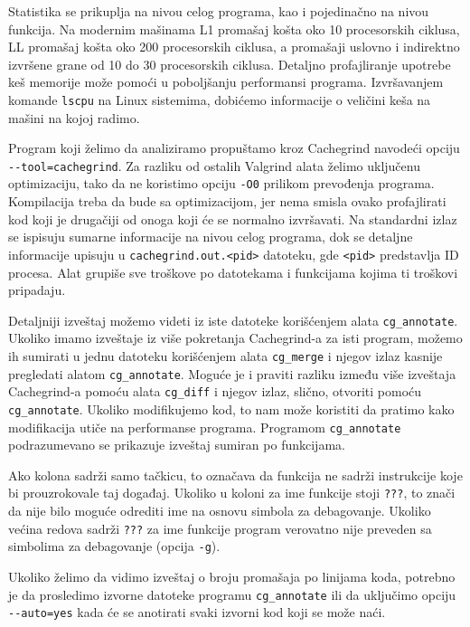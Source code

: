 Statistika se prikuplja na nivou celog programa, kao i pojedinačno na nivou funkcija. Na modernim mašinama L1 promašaj košta oko 10 procesorskih ciklusa, LL promašaj košta oko 200 procesorskih ciklusa, a promašaji uslovno i indirektno izvršene grane od 10 do 30 procesorskih ciklusa. Detaljno profajliranje upotrebe keš memorije može pomoći u poboljšanju performansi programa. Izvršavanjem komande \texttt{lscpu} na Linux sistemima, dobićemo informacije o veličini keša na mašini na kojoj radimo.

Program koji želimo da analiziramo propuštamo kroz Cachegrind navodeći opciju \texttt{-\/-tool=cachegrind}. Za razliku od ostalih Valgrind alata želimo uključenu optimizaciju, tako da ne koristimo opciju \texttt{-O0} prilikom prevođenja programa. Kompilacija treba da bude sa optimizacijom, jer nema smisla ovako profajlirati kod koji je drugačiji od onoga koji će se normalno izvršavati. Na standardni izlaz se ispisuju sumarne informacije na nivou celog programa, dok se detaljne informacije upisuju u \texttt{cachegrind.out.\textless{}pid\textgreater{}} datoteku, gde \texttt{\textless{}pid\textgreater{}} predstavlja ID procesa. Alat grupiše sve troškove po datotekama i funkcijama kojima ti troškovi pripadaju.

Detaljniji izveštaj možemo videti iz iste datoteke korišćenjem alata \texttt{cg\_annotate}. Ukoliko imamo izveštaje iz više pokretanja Cachegrind-a za isti program, možemo ih sumirati u jednu datoteku korišćenjem alata \texttt{cg\_merge} i njegov izlaz kasnije pregledati alatom \texttt{cg\_annotate}. Moguće je i praviti razliku između više izveštaja Cachegrind-a pomoću alata \texttt{cg\_diff} i njegov izlaz, slično, otvoriti pomoću \texttt{cg\_annotate}. Ukoliko modifikujemo kod, to nam može koristiti da pratimo kako modifikacija utiče na performanse programa. Programom \texttt{cg\_annotate} podrazumevano se prikazuje izveštaj sumiran po funkcijama.

Ako kolona sadrži samo tačkicu, to označava da funkcija ne sadrži instrukcije koje bi prouzrokovale taj događaj. Ukoliko u koloni za ime funkcije stoji \texttt{???}, to znači da nije bilo moguće odrediti ime na osnovu simbola za debagovanje. Ukoliko većina redova sadrži \texttt{???} za ime funkcije program verovatno nije preveden sa simbolima za debagovanje (opcija \texttt{-g}).

Ukoliko želimo da vidimo izveštaj o broju promašaja po linijama koda, potrebno je da prosledimo izvorne datoteke programu \texttt{cg\_annotate} ili da uključimo opciju \texttt{-\/-auto=yes} kada će se anotirati svaki izvorni kod koji se može naći.

